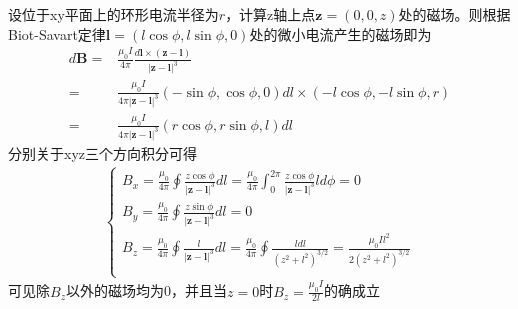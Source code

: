 设位于xy平面上的环形电流半径为$r$，计算z轴上点$\mathbf{z}=(0,0,z)$处的磁场。则根据Biot-Savart定律$\mathbf{l}=(l\cos\phi,l\sin\phi,0)$处的微小电流产生的磁场即为
\begin{align*}
    d\mathbf{B}=&\frac{\mu_0I}{4\pi}\frac{d\mathbf{l}\times(\mathbf{z}-\mathbf{l})}{|\mathbf{z}-\mathbf{l}|^3}\\
    =&\frac{\mu_0I}{4\pi|\mathbf{z}-\mathbf{l}|^3}(-\sin\phi,\cos\phi,0)dl\times(-l\cos\phi,-l\sin\phi,r)\\
    =&\frac{\mu_0I}{4\pi|\mathbf{z}-\mathbf{l}|^3}(r\cos\phi,r\sin\phi,l)dl
\end{align*}
分别关于xyz三个方向积分可得
\begin{align*}
    \begin{cases}
        B_x=\frac{\mu_0}{4\pi}\oint\frac{z\cos\phi}{|\mathbf{z}-\mathbf{l}|^3}dl
        =\frac{\mu_0}{4\pi}\int_0^{2\pi}\frac{z\cos\phi}{|\mathbf{z}-\mathbf{l}|^3}ld\phi=0\\
        B_y=\frac{\mu_0}{4\pi}\oint\frac{z\sin\phi}{|\mathbf{z}-\mathbf{l}|^3}dl=0\\
        B_z=\frac{\mu_0}{4\pi}\oint\frac{l}{|\mathbf{z}-\mathbf{l}|^3}dl
        =\frac{\mu_0}{4\pi}\oint\frac{ldl}{(z^2+l^2)^{3/2}}=\frac{\mu_0Il^2}{2(z^2+l^2)^{3/2}}\\
    \end{cases}
\end{align*}
可见除$B_z$以外的磁场均为0，并且当$z=0$时$B_z=\frac{\mu_0I}{2l}$的确成立
